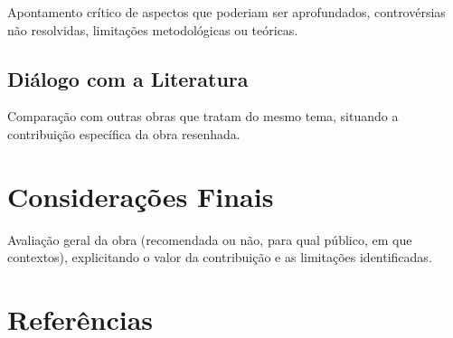 \documentclass[
  12pt,
  a4paper,
  brazilian
]{article}
\begin{document}
Apontamento crítico de aspectos que poderiam ser aprofundados,
controvérsias não resolvidas, limitações metodológicas ou teóricas.

\subsection*{Diálogo com a Literatura}

Comparação com outras obras que tratam do mesmo tema, situando a
contribuição específica da obra resenhada.

\section*{Considerações Finais}

Avaliação geral da obra (recomendada ou não, para qual público, em que
contextos), explicitando o valor da contribuição e as limitações
identificadas.

\section*{Referências}



\end{document}

